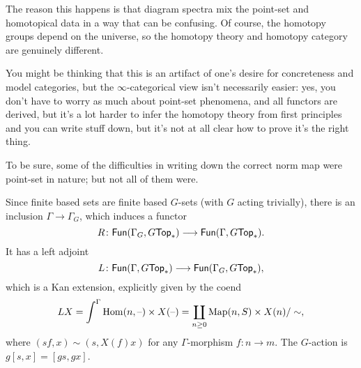 The reason this happens is that diagram spectra mix the point-set and homotopical data in a way that can be
confusing. Of course, the homotopy groups depend on the universe, so the homotopy theory and homotopy category are
genuinely different.
\begin{rem}
You might be thinking that this is an artifact of one's desire for concreteness and model categories, but the
$\infty$-categorical view isn't necessarily easier: yes, you don't have to worry as much about point-set phenomena,
and all functors are derived, but it's a lot harder to infer the homotopy theory from first principles and you can
write stuff down, but it's not at all clear how to prove it's the right thing.

To be sure, some of the difficulties in writing down the correct norm map were point-set in nature; but not all of
them were.
\end{rem}
Since finite based sets are finite based $G$-sets (with $G$ acting trivially), there is an inclusion
$\Gamma\to\Gamma_G$, which induces a functor
\[R\colon\mathsf{Fun}(\Gamma_G, G\mathsf{Top}_*)\longrightarrow\mathsf{Fun}(\Gamma, G\mathsf{Top}_*).\]
It has a left adjoint
\[L\colon\mathsf{Fun}(\Gamma, G\mathsf{Top}_*)\longrightarrow\mathsf{Fun}(\Gamma_G, G\mathsf{Top}_*),\]
which is a Kan extension, explicitly given by the coend
\[LX = \int^\Gamma \operatorname{Hom}(n, \text{--})\times X(\text{--}) = \coprod_{n\ge 0} \operatorname{Map}(n, S)\times X(n)/\sim,\]
where $(sf, x)\sim (s, X(f)x)$ for any $\Gamma$-morphism $f\colon n\to m$. The $G$-action is $g[s,x] = [gs,gx]$.

